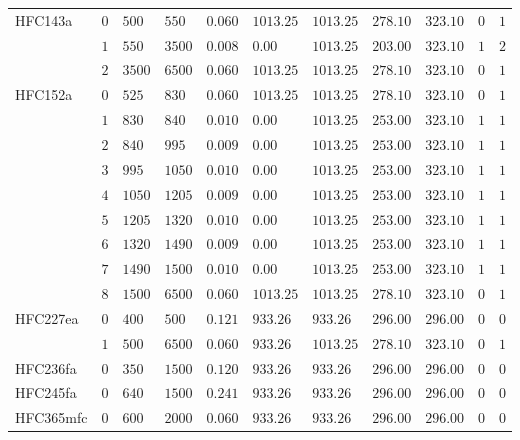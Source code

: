 \begin{table}
\begin{tabular}{lllllllllll}
HFC143a & $0$ & $500$ & $550$ & $0.060$ & $1013.25$ & $1013.25$ & $278.10$ & $323.10$ & $0$ & $1$\tabularnewline
& $1$ & $550$ & $3500$ & $0.008$ & $0.00$ & $1013.25$ & $203.00$ & $323.10$ & $1$ & $2$\tabularnewline
& $2$ & $3500$ & $6500$ & $0.060$ & $1013.25$ & $1013.25$ & $278.10$ & $323.10$ & $0$ & $1$\tabularnewline
HFC152a & $0$ & $525$ & $830$ & $0.060$ & $1013.25$ & $1013.25$ & $278.10$ & $323.10$ & $0$ & $1$\tabularnewline
& $1$ & $830$ & $840$ & $0.010$ & $0.00$ & $1013.25$ & $253.00$ & $323.10$ & $1$ & $1$\tabularnewline
& $2$ & $840$ & $995$ & $0.009$ & $0.00$ & $1013.25$ & $253.00$ & $323.10$ & $1$ & $1$\tabularnewline
& $3$ & $995$ & $1050$ & $0.010$ & $0.00$ & $1013.25$ & $253.00$ & $323.10$ & $1$ & $1$\tabularnewline
& $4$ & $1050$ & $1205$ & $0.009$ & $0.00$ & $1013.25$ & $253.00$ & $323.10$ & $1$ & $1$\tabularnewline
& $5$ & $1205$ & $1320$ & $0.010$ & $0.00$ & $1013.25$ & $253.00$ & $323.10$ & $1$ & $1$\tabularnewline
& $6$ & $1320$ & $1490$ & $0.009$ & $0.00$ & $1013.25$ & $253.00$ & $323.10$ & $1$ & $1$\tabularnewline
& $7$ & $1490$ & $1500$ & $0.010$ & $0.00$ & $1013.25$ & $253.00$ & $323.10$ & $1$ & $1$\tabularnewline
& $8$ & $1500$ & $6500$ & $0.060$ & $1013.25$ & $1013.25$ & $278.10$ & $323.10$ & $0$ & $1$\tabularnewline
HFC227ea & $0$ & $400$ & $500$ & $0.121$ & $933.26$ & $933.26$ & $296.00$ & $296.00$ & $0$ & $0$\tabularnewline
& $1$ & $500$ & $6500$ & $0.060$ & $933.26$ & $1013.25$ & $278.10$ & $323.10$ & $0$ & $1$\tabularnewline
HFC236fa & $0$ & $350$ & $1500$ & $0.120$ & $933.26$ & $933.26$ & $296.00$ & $296.00$ & $0$ & $0$\tabularnewline
HFC245fa & $0$ & $640$ & $1500$ & $0.241$ & $933.26$ & $933.26$ & $296.00$ & $296.00$ & $0$ & $0$\tabularnewline
HFC365mfc & $0$ & $600$ & $2000$ & $0.060$ & $933.26$ & $933.26$ & $296.00$ & $296.00$ & $0$ & $0$\tabularnewline
\hline 
\end{tabular}

\end{table}


